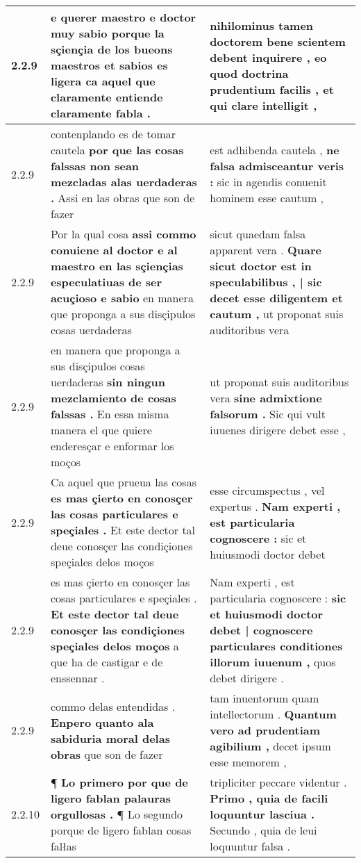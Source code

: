 \begin{tabular}{|p{1cm}|p{6.5cm}|p{6.5cm}|}
2.2.9 & e querer maestro e doctor muy sabio \textbf{ porque la sçiençia de los bueons maestros et sabios es ligera } ca aquel que claramente entiende claramente fabla . & nihilominus tamen doctorem bene scientem debent inquirere , \textbf{ eo quod doctrina prudentium facilis , } et qui clare intelligit , \\\hline
2.2.9 & contenplando es de tomar cautela \textbf{ por que las cosas falssas non sean mezcladas alas uerdaderas . } Assi en las obras que son de fazer & est adhibenda cautela , \textbf{ ne falsa admisceantur veris : } sic in agendis conuenit hominem esse cautum , \\\hline
2.2.9 & Por la qual cosa \textbf{ assi commo conuiene al doctor e al maestro en las sçiençias especulatiuas de ser acuçioso e sabio } en manera que proponga a sus disçipulos cosas uerdaderas & sicut quaedam falsa apparent vera . \textbf{ Quare sicut doctor est in speculabilibus , | sic decet esse diligentem et cautum , } ut proponat suis auditoribus vera \\\hline
2.2.9 & en manera que proponga a sus disçipulos cosas uerdaderas \textbf{ sin ningun mezclamiento de cosas falssas . } En essa misma manera el que quiere enderesçar e enformar los moços & ut proponat suis auditoribus vera \textbf{ sine admixtione falsorum . } Sic qui vult iuuenes dirigere debet esse , \\\hline
2.2.9 & Ca aquel que prueua las cosas \textbf{ es mas çierto en conosçer las cosas particulares e speçiales . } Et este dector tal deue conosçer las condiçiones speçiales delos moços & esse circumspectus , vel expertus . \textbf{ Nam experti , est particularia cognoscere : } sic et huiusmodi doctor debet \\\hline
2.2.9 & es mas çierto en conosçer las cosas particulares e speçiales . \textbf{ Et este dector tal deue conosçer las condiçiones speçiales delos moços } a que ha de castigar e de enssennar . & Nam experti , est particularia cognoscere : \textbf{ sic et huiusmodi doctor debet | cognoscere particulares conditiones illorum iuuenum , } quos debet dirigere . \\\hline
2.2.9 & commo delas entendidas . \textbf{ Enpero quanto ala sabiduria moral delas obras } que son de fazer & tam inuentorum quam intellectorum . \textbf{ Quantum vero ad prudentiam agibilium , } decet ipsum esse memorem , \\\hline
2.2.10 & ¶ \textbf{ Lo primero por que de ligero fablan palauras orgullosas . } ¶ Lo segundo porque de ligero fablan cosas falłas & tripliciter peccare videntur . \textbf{ Primo , quia de facili loquuntur lasciua . } Secundo , quia de leui loquuntur falsa . \\\hline

\end{tabular}
